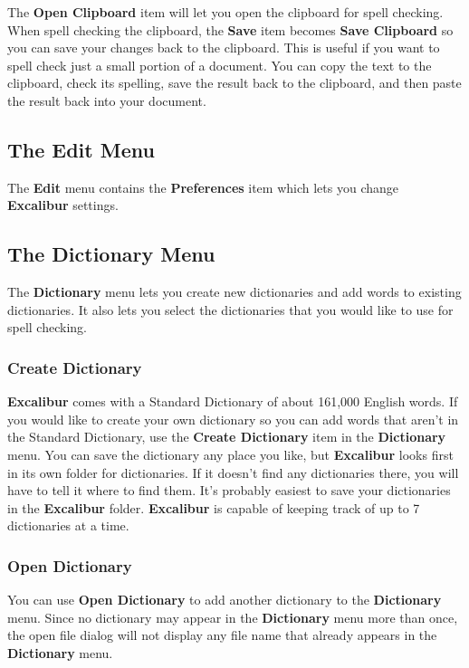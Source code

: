 \documentclass[11pt,titlepage]{article}
\newcommand{\ex}{\textbf{Excalibur}}
\begin{document}
The \textbf{Open Clipboard} item will let you open the clipboard for
spell checking.  When spell checking the clipboard, the \textbf{Save}
item becomes \textbf{Save Clipboard} so you can save your changes back
to the clipboard.  This is useful if you want to spell check just a
small portion of a document.  You can copy the text to the clipboard,
check its spelling, save the result back to the clipboard, and then
paste the result back into your document.

\subsection{The Edit Menu}

The \textbf{Edit} menu contains the \textbf{Preferences} item which
lets you change \ex{} settings.

\subsection{The Dictionary Menu}

The \textbf{Dictionary} menu lets you create new dictionaries and add
words to existing dictionaries. It also lets you select the
dictionaries that you would like to use for spell checking.

\subsubsection{Create Dictionary}

\ex{} comes with a Standard Dictionary of about 161,000 English words.
If you would like to create your own dictionary so you can add words
that aren't in the Standard Dictionary, use the \textbf{Create
  Dictionary} item in the \textbf{Dictionary} menu. You can save the
dictionary any place you like, but \ex{} looks first in its own folder
for dictionaries. If it doesn't find any dictionaries there, you will
have to tell it where to find them. It's probably easiest to save your
dictionaries in the \ex{} folder.  \ex{} is capable of keeping track
of up to 7 dictionaries at a time.

\subsubsection{Open Dictionary}

You can use \textbf{Open Dictionary} to add another dictionary to the
\textbf{Dictionary} menu.  Since no dictionary may appear in the
\textbf{Dictionary} menu more than once, the open file dialog will not
display any file name that already appears in the \textbf{Dictionary}
menu.
\end{document}
